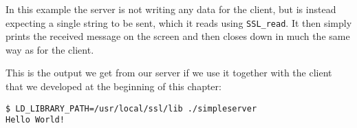 In this example the server is not writing any data for the client, but is 
instead expecting a single string to be sent, which it reads using 
\verb!SSL_read!. It then simply prints the received message on the screen and 
then closes down in much the same way as for the client.

This is the output we get from our server if we use it together with the client 
that we developed at the beginning of this chapter:

\begin{verbatim}
$ LD_LIBRARY_PATH=/usr/local/ssl/lib ./simpleserver 
Hello World!
\end{verbatim}

